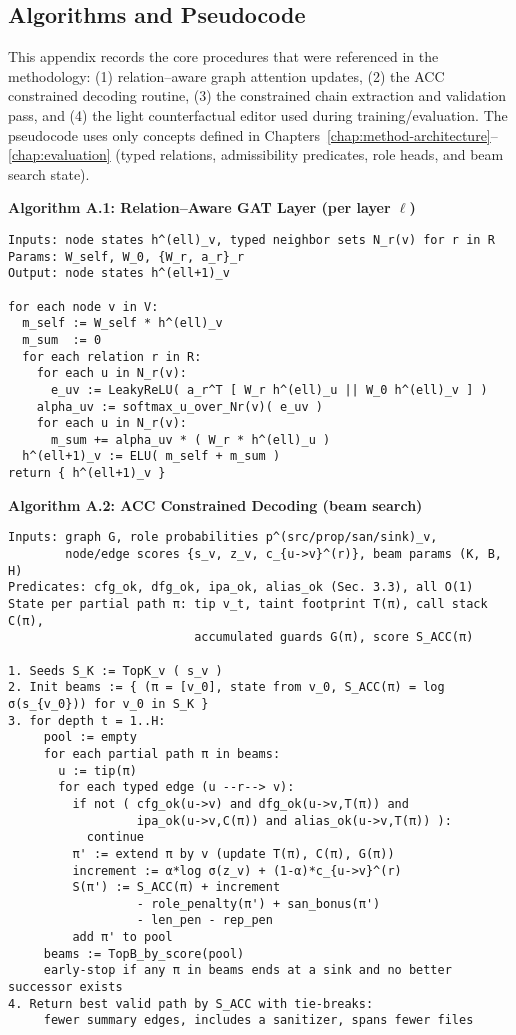 \documentclass{buthesis}
\begin{document}
\cleardoublepage
{}
\begin{appendices}

\chapter{Algorithms and Pseudocode}

This appendix records the core procedures that were referenced in the methodology:
(1) relation–aware graph attention updates,
(2) the ACC constrained decoding routine,
(3) the constrained chain extraction and validation pass, and
(4) the light counterfactual editor used during training/evaluation.
The pseudocode uses only concepts defined in Chapters~\ref{chap:method-architecture}–\ref{chap:evaluation}
(typed relations, admissibility predicates, role heads, and beam search state).

\bigskip
\noindent\textbf{Algorithm A.1: Relation–Aware GAT Layer (per layer $\ell$)}
\begin{lstlisting}
Inputs: node states h^(ell)_v, typed neighbor sets N_r(v) for r in R
Params: W_self, W_0, {W_r, a_r}_r
Output: node states h^(ell+1)_v

for each node v in V:
  m_self := W_self * h^(ell)_v
  m_sum  := 0
  for each relation r in R:
    for each u in N_r(v):
      e_uv := LeakyReLU( a_r^T [ W_r h^(ell)_u || W_0 h^(ell)_v ] )
    alpha_uv := softmax_u_over_Nr(v)( e_uv )
    for each u in N_r(v):
      m_sum += alpha_uv * ( W_r * h^(ell)_u )
  h^(ell+1)_v := ELU( m_self + m_sum )
return { h^(ell+1)_v }
\end{lstlisting}

\noindent\textbf{Algorithm A.2: ACC Constrained Decoding (beam search)}
\begin{lstlisting}
Inputs: graph G, role probabilities p^(src/prop/san/sink)_v,
        node/edge scores {s_v, z_v, c_{u->v}^(r)}, beam params (K, B, H)
Predicates: cfg_ok, dfg_ok, ipa_ok, alias_ok (Sec. 3.3), all O(1)
State per partial path π: tip v_t, taint footprint T(π), call stack C(π),
                          accumulated guards G(π), score S_ACC(π)

1. Seeds S_K := TopK_v ( s_v )
2. Init beams := { (π = [v_0], state from v_0, S_ACC(π) = log σ(s_{v_0})) for v_0 in S_K }
3. for depth t = 1..H:
     pool := empty
     for each partial path π in beams:
       u := tip(π)
       for each typed edge (u --r--> v):
         if not ( cfg_ok(u->v) and dfg_ok(u->v,T(π)) and
                  ipa_ok(u->v,C(π)) and alias_ok(u->v,T(π)) ):
           continue
         π' := extend π by v (update T(π), C(π), G(π))
         increment := α*log σ(z_v) + (1-α)*c_{u->v}^(r)
         S(π') := S_ACC(π) + increment
                  - role_penalty(π') + san_bonus(π')
                  - len_pen - rep_pen
         add π' to pool
     beams := TopB_by_score(pool)
     early-stop if any π in beams ends at a sink and no better successor exists
4. Return best valid path by S_ACC with tie-breaks:
     fewer summary edges, includes a sanitizer, spans fewer files
\end{lstlisting}


\end{appendices}
\end{document}
